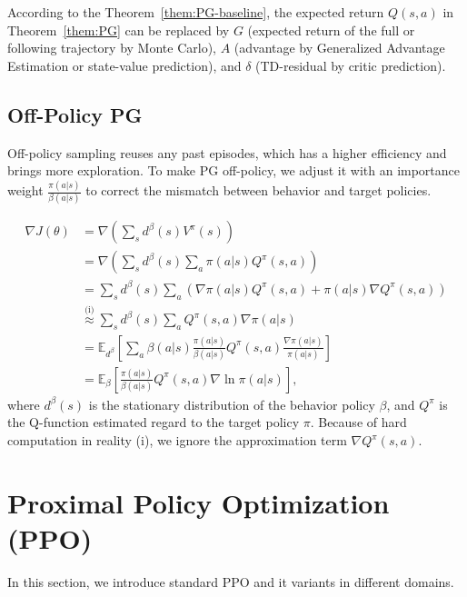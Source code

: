 \documentclass{article} %
\begin{document}
According to the Theorem~\ref{them:PG-baseline}, the expected return $Q(s,a)$ in Theorem~\ref{them:PG} can be replaced by $G$ (expected return of the full or following trajectory by Monte Carlo), $A$ (advantage by Generalized Advantage Estimation or state-value prediction), and $\delta$ (TD-residual by critic prediction).


\subsection{Off-Policy PG}

Off-policy sampling reuses any past episodes, which has a higher efficiency and brings more exploration. To make PG off-policy, we adjust it with an importance weight $\frac{\pi(a|s)}{\beta(a|s)}$ to correct the mismatch between behavior and target policies. 

\begin{equation}\label{equ:pgthem-off-policy}
        \begin{aligned}  
            \nabla J(\theta) &=\nabla \left(\sum_s d^\beta(s) V^\pi(s)\right)\\
            &=\nabla\left(\sum_s d^\beta(s) \sum_a \pi(a|s) Q^\pi(s,a)\right)\\
            &=\sum_s d^\beta(s) \sum_a (\nabla \pi(a|s) Q^\pi(s,a)+\pi(a|s) \nabla Q^\pi(s,a))\\
            &\stackrel{\text{(i)}}{\approx} \sum_s d^\beta(s) \sum_a Q^\pi(s,a) \nabla \pi(a|s) \\
            &=\mathbb{E}_{d^\beta}\left[\sum_a \beta(a|s) \frac{\pi(a|s)}{\beta(a|s)}  Q^\pi(s,a) \frac{\nabla \pi(a|s)}{\pi(a|s)}\right]\\
            &=\mathbb{E}_{\beta}\left[\frac{\pi(a|s)}{\beta(a|s)}  Q^\pi(s,a) \nabla\ln \pi(a|s)\right],
        \end{aligned}
\end{equation}
where $d^\beta(s)$ is the stationary distribution of the behavior policy $\beta$, and $Q^\pi$ is the Q-function estimated regard to the target policy $\pi$. Because of hard computation in reality (i), we ignore the approximation term $\nabla Q^\pi(s,a)$. 

\newpage
\section{Proximal Policy Optimization (PPO)}

In this section, we introduce standard PPO and it variants in different domains.
\end{document}

